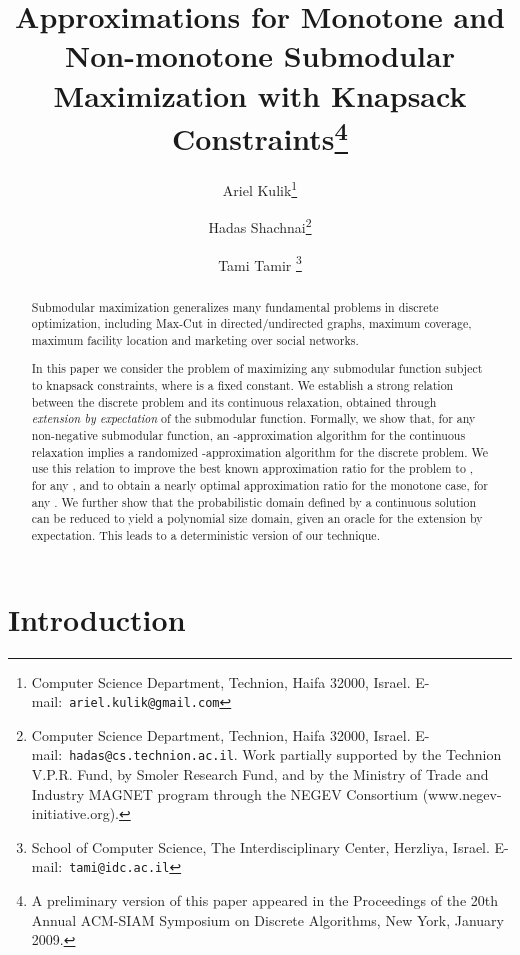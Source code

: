 \documentclass[11pt]{article}
\begin{document}
\title{\Large
Approximations for Monotone and Non-monotone Submodular Maximization
with
Knapsack Constraints\footnote{A preliminary version of this paper appeared in the Proceedings of the 20th Annual ACM-SIAM Symposium on Discrete
Algorithms, New York, January 2009.}}
\author{
Ariel Kulik\thanks{Computer Science Department, Technion, Haifa 32000,
Israel. \mbox{E-mail: {\tt ariel.kulik@gmail.com}}} \and Hadas
Shachnai\thanks{Computer Science Department, Technion, Haifa 32000,
Israel. \mbox{E-mail: {\tt hadas@cs.technion.ac.il}}. Work partially supported
by the Technion V.P.R. Fund, by Smoler Research Fund, and by the Ministry of Trade and Industry MAGNET
program through the NEGEV
Consortium (www.negev-initiative.org). }
\and Tami Tamir
\thanks{ School of Computer Science, The
Interdisciplinary Center, Herzliya, Israel.
\mbox{E-mail: {\tt tami@idc.ac.il}}}
}
\date{}

\maketitle


\begin{abstract}

Submodular maximization generalizes many fundamental problems in
discrete optimization, including Max-Cut in directed/undirected
graphs, maximum coverage, maximum facility location and marketing
over social networks.

In this paper we consider the problem of maximizing any submodular
function subject to  knapsack constraints, where  is a fixed
constant. We establish a strong relation between the discrete
problem and its continuous relaxation, obtained through {\em
extension by expectation} of the submodular function. Formally, we
show that, for any non-negative submodular function, an
-approximation algorithm for the continuous relaxation
implies a randomized -approximation algorithm for
the discrete problem. We use this relation to improve the best
known approximation ratio for the problem to , for any
, and to obtain a nearly optimal
approximation ratio for the monotone case, for
any .
We further show that the probabilistic domain defined by a
continuous solution can be reduced to yield a polynomial size
domain, given an oracle for the extension by expectation. This
leads to a deterministic version of our technique.
\end{abstract}
\bigskip



\section{Introduction} \label{sec:intro}
\end{document}
